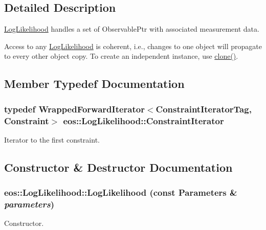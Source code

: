 \subsection{Detailed Description}
\hyperlink{classeos_1_1LogLikelihood}{LogLikelihood} handles a set of ObservablePtr with associated measurement data.

Access to any \hyperlink{classeos_1_1LogLikelihood}{LogLikelihood} is coherent, i.e., changes to one object will propagate to every other object copy. To create an independent instance, use \hyperlink{classeos_1_1LogLikelihood_a0aed658b79b9915a79ceba3a2fe10509}{clone()}. 

\subsection{Member Typedef Documentation}
\hypertarget{classeos_1_1LogLikelihood_a48b422865426d34047c9757e2d5f4f92}{
\subsubsection[{ConstraintIterator}]{\setlength{\rightskip}{0pt plus 5cm}typedef {\bf WrappedForwardIterator}$<$ConstraintIteratorTag, {\bf Constraint}$>$ {\bf eos::LogLikelihood::ConstraintIterator}}}
\label{classeos_1_1LogLikelihood_a48b422865426d34047c9757e2d5f4f92}


Iterator to the first constraint. 

\subsection{Constructor \& Destructor Documentation}
\hypertarget{classeos_1_1LogLikelihood_aaa2ab4108cc72397704139e01aca6316}{
\subsubsection[{LogLikelihood}]{\setlength{\rightskip}{0pt plus 5cm}eos::LogLikelihood::LogLikelihood (const {\bf Parameters} \& {\em parameters})}}
\label{classeos_1_1LogLikelihood_aaa2ab4108cc72397704139e01aca6316}
Constructor.


